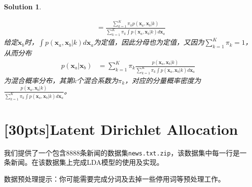 \documentclass[a4paper,UTF8]{article}
\newtheorem*{solution}{Solution}
\numberwithin{equation}{section}
\begin{document}
\begin{solution}
\begin{enumerate}[$1.$]
\begin{align*}
       	&=\frac{\sum_{k=1}^{K}\pi_kp(\boldsymbol{x}_a,\boldsymbol{x}_b|k)}{\sum_{k=1}^{K}\pi_k\int p(\boldsymbol{x}_a,\boldsymbol{x}_b|k)d\boldsymbol{x}_a}
       \end{align*}
   给定$\boldsymbol{x}_b$时，$\int p(\boldsymbol{x}_a,\boldsymbol{x}_b|k)d\boldsymbol{x}_a$为定值，因此分母也为定值，又因为$\sum_{k=1}^K\pi_k=1$，从而分布
   \begin{align*}
   	 p(\boldsymbol{x}_a|\boldsymbol{x}_b)&=\sum_{k=1}^{K}\pi_k \frac{p(\boldsymbol{x}_a,\boldsymbol{x}_b|k)}{\sum_{k=1}^{K}\pi_k\int p(\boldsymbol{x}_a,\boldsymbol{x}_b|k)d\boldsymbol{x}_a}
   \end{align*}
   为混合概率分布，其第$k$个混合系数为$\pi_k$，对应的分量概率密度为$\frac{p(\boldsymbol{x}_a,\boldsymbol{x}_b|k)}{\sum_{k=1}^{K}\pi_k\int p(\boldsymbol{x}_a,\boldsymbol{x}_b|k)d\boldsymbol{x}_a}$。
\end{enumerate}
\end{solution}

\section{\textbf{[30pts]}Latent Dirichlet Allocation}
我们提供了一个包含$8888$条新闻的数据集\texttt{news.txt.zip}，该数据集中每一行是一条新闻。在该数据集上完成LDA模型的使用及实现。

数据预处理提示：你可能需要完成分词及去掉一些停用词等预处理工作。
\end{document}
